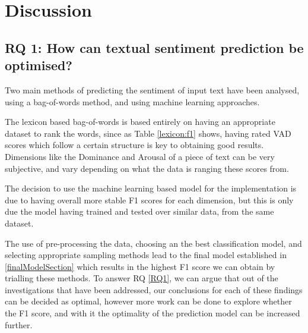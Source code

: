 \section{Discussion} 
\subsection{RQ 1: How can textual sentiment prediction be optimised?}

Two main methods of predicting the sentiment of input text have been analysed, using a bag-of-words method, and using machine learning approaches.

The lexicon based bag-of-words is based entirely on having an appropriate dataset to rank the words, since as Table \ref{lexicon:f1} shows, having rated VAD scores which follow a certain structure is key to obtaining good results. Dimensions like the Dominance and Arousal of a piece of text can be very subjective, and vary depending on what the data is ranging these scores from. 

The decision to use the machine learning based model for the implementation is due to having overall more stable F1 scores for each dimension, but this is only due the model having trained and tested over similar data, from the same dataset.

The use of pre-processing the data, choosing an the best classification model, and selecting appropriate sampling methods lead to the final model established in \ref{finalModelSection} which results in the highest F1 score we can obtain by trialling these methods. To answer RQ \ref{RQ1}, we can argue that out of the investigations that have been addressed, our conclusions for each of these findings can be decided as optimal, however more work can be done to explore whether the F1 score, and with it the optimality of the prediction model can be increased further.

